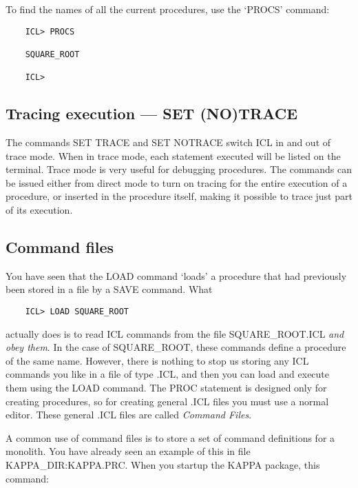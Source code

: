 To find the names of all the current procedures, use the `PROCS' command:

\begin{small}
\begin{verbatim}
    ICL> PROCS

    SQUARE_ROOT

    ICL>
\end{verbatim}
\end{small}


\subsection{Tracing execution --- SET (NO)TRACE}

The commands SET TRACE and SET NOTRACE switch ICL in and out of trace mode.
When in trace mode, each statement executed will be listed on the terminal.
Trace mode is very useful for debugging procedures.
The commands can be issued either from direct mode to turn on tracing for the
entire execution of a procedure, or inserted in the procedure itself, making
it possible to trace just part of its execution.

\subsection{Command files}

You have seen that the LOAD command `loads' a procedure that had previously
been stored in a file by a SAVE command.
What

\begin{small}
\begin{verbatim}
    ICL> LOAD SQUARE_ROOT
\end{verbatim}
\end{small}

actually does is to read ICL commands from the file SQUARE\_ROOT.ICL
{\em and obey them}.
In the case of SQUARE\_ROOT, these commands define a procedure of the same
name.
However, there is nothing to stop us storing any ICL commands you like in a
file of type .ICL, and then you can load and execute them using the LOAD
command.
The PROC statement is designed only for creating procedures, so for creating
general .ICL files you must use a normal editor.
These general .ICL files are called {\em Command Files}.

A common use of command files is to store a set of command definitions
for a monolith.
You have already seen an example of this in file KAPPA\_DIR:KAPPA.PRC.
When you startup the KAPPA package, this command:

